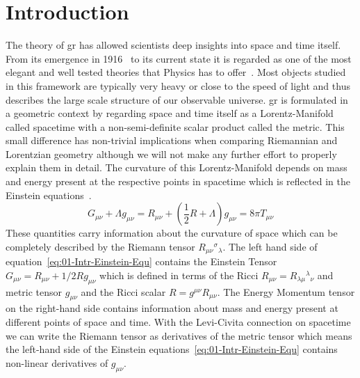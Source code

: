 \section{Introduction}
\label{sec:01-Introduction}
The theory of \ac{gr} has allowed scientists deep insights into space and time itself.
From its emergence in 1916~\cite{einsteinGrundlageAllgemeinenRelativitaetstheorie1916a} to its current state it is regarded as one of the most elegant and well tested theories that Physics has to offer~\cite{hafeleAroundtheWorldAtomicClocks1972, vessotTestRelativisticGravitation1980a, battatApachePointObservatory2009}.
Most objects studied in this framework are typically very heavy or close to the speed of light and thus describes the large scale structure of our observable universe.
\ac{gr} is formulated in a geometric context by regarding space and time itself as a Lorentz-Manifold called spacetime with a non-semi-definite scalar product called the metric.
This small difference has non-trivial implications when comparing Riemannian and Lorentzian geometry although we will not make any further effort to properly explain them in detail.
The curvature of this Lorentz-Manifold depends on mass and energy present at the respective points in spacetime which is reflected in the Einstein equations~\cite{einsteinFeldgleichungenGravitation1915}.
\begin{equation}
	G_{\mu\nu}+\Lambda g_{\mu\nu} = R_{\mu\nu} + \left(\frac{1}{2}R+\Lambda\right)g_{\mu\nu}=8\pi T_{\mu\nu}
	\label{eq:01-Intr-Einstein-Equ}
\end{equation}
These quantities carry information about the curvature of space which can be completely described by the Riemann tensor $R_{\mu \nu}{ }^{\sigma}{ }_{\lambda}$.
The left hand side of equation~\ref{eq:01-Intr-Einstein-Equ} contains the Einstein Tensor $G_{\mu\nu}=R_{\mu\nu}+1/2Rg_{\mu\nu}$ which is defined in terms of the Ricci $R_{\mu \nu}=R_{\lambda\mu}{}^{\lambda}{}_\nu$ and metric tensor $g_{\mu\nu}$ and the Ricci scalar $R=g^{\mu\nu}R_{\mu\nu}$.
The Energy Momentum tensor on the right-hand side contains information about mass and energy present at different points of space and time.
With the Levi-Civita connection on spacetime we can write the Riemann tensor as derivatives of the metric tensor which means the left-hand side of the Einstein equations~\ref{eq:01-Intr-Einstein-Equ} contains non-linear derivatives of $g_{\mu\nu}$.
